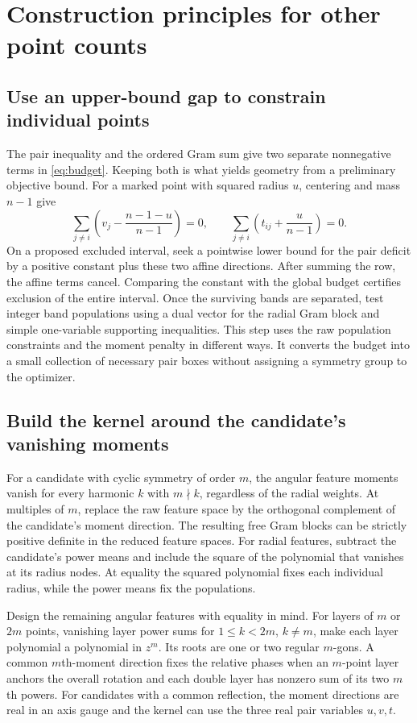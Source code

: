 \documentclass[11pt,letterpaper]{article}
\theoremstyle{remark}
\begin{document}
\section{Construction principles for other point counts}
\label{sec:methods}

\subsection{Use an upper-bound gap to constrain individual points}
The pair inequality and the ordered Gram sum give two separate
nonnegative terms in \eqref{eq:budget}. Keeping both is what yields
geometry from a preliminary objective bound. For a marked point with
squared radius \(u\), centering and mass \(n-1\) give
\[
 \sum_{j\ne i}\left(v_j-\frac{n-1-u}{n-1}\right)=0,\qquad
 \sum_{j\ne i}\left(t_{ij}+\frac{u}{n-1}\right)=0.
\]
On a proposed excluded interval, seek a pointwise lower bound for the pair
deficit by a positive constant plus these two affine directions. After
summing the row, the affine terms cancel. Comparing the constant with the
global budget certifies exclusion of the entire interval. Once the surviving
bands are separated, test integer band populations using a dual vector for
the radial Gram block and simple one-variable supporting inequalities.
This step uses the raw population constraints and the moment penalty in
different ways. It converts the budget into a small collection of
necessary pair boxes without assigning a symmetry group to the optimizer.

\subsection{Build the kernel around the candidate's vanishing moments}
For a candidate with cyclic symmetry of order \(m\), the angular feature
moments vanish for every harmonic \(k\) with \(m\nmid k\), regardless of the
radial weights. At multiples of \(m\), replace the raw feature space by
the orthogonal complement of the candidate's moment direction. The
resulting free Gram blocks can be strictly positive definite in the
reduced feature spaces. For radial features, subtract the candidate's
power means and include the square of the polynomial that vanishes at
its radius nodes. At equality the squared polynomial fixes each
individual radius, while the power means fix the populations.

Design the remaining angular features with equality in mind. For layers
of \(m\) or \(2m\) points, vanishing layer power sums for
\(1\le k<2m\), \(k\ne m\), make each layer polynomial a polynomial in
\(z^m\). Its roots are one or two regular \(m\)-gons. A common
\(m\)th-moment direction fixes the relative phases when an \(m\)-point
layer anchors the overall rotation and each double layer has nonzero
sum of its two \(m\)th powers. For candidates with a common reflection,
the moment directions are real in an axis gauge and the kernel can use
the three real pair variables \(u,v,t\).
\end{document}
